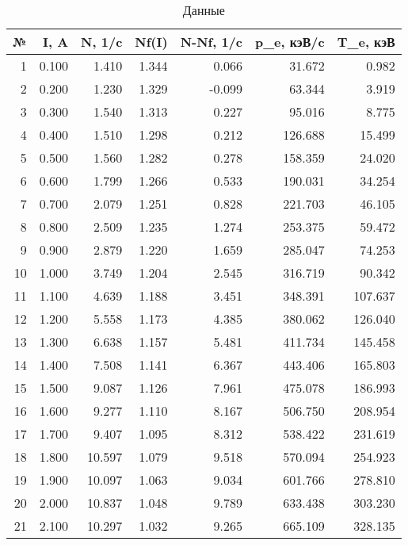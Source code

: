 \begin{table}[H]
\centering
\caption{Данные}
\label{t1}
\begin{tabular}{rrrrrrr}
\toprule
 № &  I, A &  N, 1/c &  Nf(I) &  N-Nf, 1/c &  p\_e, кэВ/c &  T\_e, кэВ \\
\midrule
 1 & 0.100 &   1.410 &  1.344 &      0.066 &      31.672 &     0.982 \\
 2 & 0.200 &   1.230 &  1.329 &     -0.099 &      63.344 &     3.919 \\
 3 & 0.300 &   1.540 &  1.313 &      0.227 &      95.016 &     8.775 \\
 4 & 0.400 &   1.510 &  1.298 &      0.212 &     126.688 &    15.499 \\
 5 & 0.500 &   1.560 &  1.282 &      0.278 &     158.359 &    24.020 \\
 6 & 0.600 &   1.799 &  1.266 &      0.533 &     190.031 &    34.254 \\
 7 & 0.700 &   2.079 &  1.251 &      0.828 &     221.703 &    46.105 \\
 8 & 0.800 &   2.509 &  1.235 &      1.274 &     253.375 &    59.472 \\
 9 & 0.900 &   2.879 &  1.220 &      1.659 &     285.047 &    74.253 \\
10 & 1.000 &   3.749 &  1.204 &      2.545 &     316.719 &    90.342 \\
11 & 1.100 &   4.639 &  1.188 &      3.451 &     348.391 &   107.637 \\
12 & 1.200 &   5.558 &  1.173 &      4.385 &     380.062 &   126.040 \\
13 & 1.300 &   6.638 &  1.157 &      5.481 &     411.734 &   145.458 \\
14 & 1.400 &   7.508 &  1.141 &      6.367 &     443.406 &   165.803 \\
15 & 1.500 &   9.087 &  1.126 &      7.961 &     475.078 &   186.993 \\
16 & 1.600 &   9.277 &  1.110 &      8.167 &     506.750 &   208.954 \\
17 & 1.700 &   9.407 &  1.095 &      8.312 &     538.422 &   231.619 \\
18 & 1.800 &  10.597 &  1.079 &      9.518 &     570.094 &   254.923 \\
19 & 1.900 &  10.097 &  1.063 &      9.034 &     601.766 &   278.810 \\
20 & 2.000 &  10.837 &  1.048 &      9.789 &     633.438 &   303.230 \\
21 & 2.100 &  10.297 &  1.032 &      9.265 &     665.109 &   328.135 \\

\end{tabular}
\end{table}
